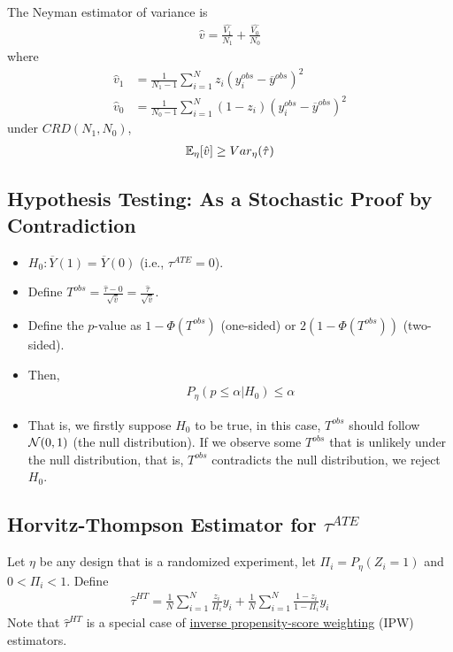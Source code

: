 \documentclass[11pt]{article}
\newcommand{\tauhat}[0]{\hat{\tau}}
\begin{document}
	\begin{proposition}
		The Neyman estimator of variance is
		\begin{align}
			\hat{v} = \frac{\hat{V_1}}{N_1} + \frac{\hat{V_0}}{N_0}
		\end{align}
		where
		\begin{align}
			\hat{v}_{1}&=\frac{1}{N_{1}-1} \sum_{i=1}^N z_{i}\left(y_{i}^{obs}-\overline{y}^{obs}\right)^2 \\
			\hat{v}_{0}&=\frac{1}{N_{0}-1} \sum_{i=1}^N (1-z_{i})\left(y_{i}^{obs}-\overline{y}^{obs}\right)^2
		\end{align}
		under $CRD(N_1, N_0)$,
		\begin{align}
			\expe_\eta[\hat{v}] \geq Var_\eta(\tauhat)
		\end{align}
	\end{proposition}
	\subsection{Hypothesis Testing: As a Stochastic Proof by Contradiction}
	\begin{itemize}
		\item $H_0: \overline{Y}(1) = \overline{Y}(0)$ (i.e., $\tau^{ATE} = 0$).
		\item Define $T^{obs} = \frac{\tauhat-0}{\sqrt{\hat{v}}} = \frac{\tauhat}{\sqrt{\hat{v}}}$.
		\item Define the $p$-value as $1 - \Phi(T^{obs})$ (one-sided) or $2 (1 - \Phi(T^{obs}))$ (two-sided).
		\item Then,
		\begin{align}
			P_\eta(p \leq \alpha | H_0) \leq \alpha
		\end{align}
		\item That is, we firstly suppose $H_0$ to be true, in this case, $T^{obs}$ should follow $\mathcal{{N}}(0, 1)$ (the null distribution). If we observe some $T^{obs}$ that is unlikely under the null distribution, that is, $T^{obs}$ contradicts the null distribution, we reject $H_0$.
	\end{itemize}
	
	\subsection{Horvitz-Thompson Estimator for $\tau^{ATE}$}
	\begin{definition}
		Let $\eta$ be any design that is a randomized experiment, let $\Pi_i = P_\eta(Z_i=1)$ and $0 < \Pi_i < 1$. Define
		\begin{align}
			\tauhat^{HT} = \frac{1}{N} \sum_{i=1}^N \frac{z_i}{\Pi_i}y_i + \frac{1}{N} \sum_{i=1}^N \frac{1-z_i}{1-\Pi_i}y_i
		\end{align}
		Note that $\tauhat^{HT}$ is a special case of \ul{inverse propensity-score weighting} (IPW) estimators.
	\end{definition}
	
\end{document}
